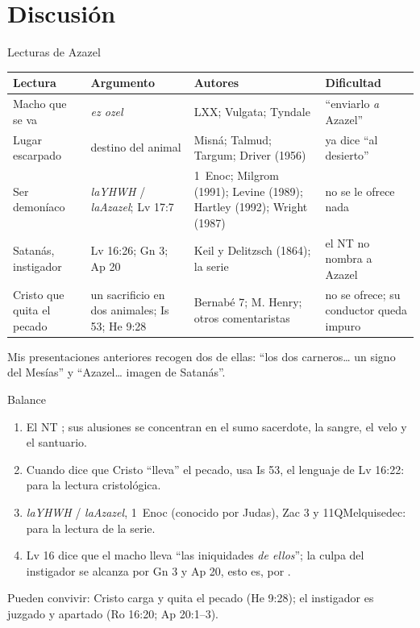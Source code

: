 \section{Discusión}

\begin{frame}{Lecturas de Azazel}
\tiny\renewcommand{\arraystretch}{1.15}
\begin{tabular}{@{}L{2.4cm}L{3.6cm}L{3.5cm}L{2.4cm}@{}}
\toprule
\textbf{Lectura} & \textbf{Argumento} & \textbf{Autores} & \textbf{Dificultad} \\ \midrule
Macho que se va & \emph{ez ozel} & LXX; Vulgata; Tyndale & ``enviarlo \emph{a} Azazel'' \\
Lugar escarpado & destino del animal & Misná; Talmud; Targum; Driver (1956) & ya dice ``al desierto'' \\
Ser demoníaco & \emph{laYHWH} / \emph{laAzazel}; Lv 17:7 & 1~Enoc; Milgrom (1991); Levine (1989); Hartley (1992); Wright (1987) & no se le ofrece nada \\
Satanás, instigador & Lv 16:26; Gn 3; Ap 20 & Keil y Delitzsch (1864); la serie & el NT no nombra a Azazel \\
Cristo que quita el pecado & un sacrificio en dos animales; Is 53; He 9:28 & Bernabé 7; M. Henry; otros comentaristas & no se ofrece; su conductor queda impuro \\
\bottomrule
\end{tabular}\par\medskip
\scriptsize Mis presentaciones anteriores recogen dos de ellas: ``los dos carneros\ldots{} un signo del Mesías'' y ``Azazel\ldots{} imagen de Satanás''.
\end{frame}

\begin{frame}{Balance}
\small
\begin{enumerate}\setlength{\itemsep}{2pt}
\item El NT ; sus alusiones se concentran en el sumo sacerdote, la sangre, el velo y el santuario.
\item Cuando dice que Cristo ``lleva'' el pecado, usa Is 53, el lenguaje de Lv 16:22:  para la lectura cristológica.
\item \emph{laYHWH} / \emph{laAzazel}, 1~Enoc (conocido por Judas), Zac 3 y 11QMelquisedec:  para la lectura de la serie.
\item Lv 16 dice que el macho lleva ``las iniquidades \emph{de ellos}''; la culpa del instigador se alcanza por Gn 3 y Ap 20, esto es, por .
\end{enumerate}
\scriptsize Pueden convivir: Cristo carga y quita el pecado (He 9:28); el instigador es juzgado y apartado (Ro 16:20; Ap 20:1--3).
\end{frame}

